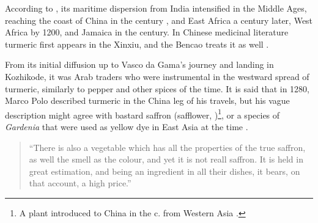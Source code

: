 According to \textcite[2]{nair_turmeric_2019}, its maritime dispersion from India intensified in the Middle Ages, reaching the coast of China in the  century \AD, and East Africa a century later, West Africa by 1200, and Jamaica in the  century. In Chinese medicinal literature turmeric first appears in the \gls{Xinxiu}, and the \gls{Bencao} treats it as well \autocite{feng_molecular_2011}. 

From its initial diffusion up to Vasco da Gama's journey and landing in Kozhikode, it was Arab traders who were instrumental in the westward spread of turmeric, similarly to pepper and other spices of the time. It is said that in 1280, Marco Polo described turmeric in the China leg of his travels, but his vague description might agree with bastard saffron (safflower, )\footnote{A plant introduced to China in the  c. \BC from Western Asia \autocite[226]{polo_travels_1993}.}, or a species of \textit{Gardenia} that were used as yellow dye in East Asia at the time \autocite[226]{polo_travels_1993}.

\begin{quote}
	``There is also a vegetable which has all the properties of the true saffron, as well the smell as the colour, and yet it is not reall saffron. It is held in great estimation, and being an ingredient in all their dishes, it bears, on that account, a high price.'' \autocite[251-252]{komroff_travels_1926}
\end{quote}


